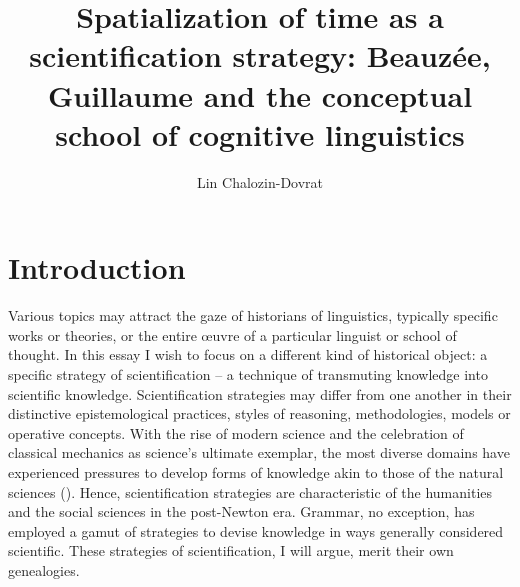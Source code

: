 \documentclass[output=paper]{langsci/langscibook}
\author{Lin Chalozin-Dovrat\affiliation{Cohn Institute for the History and Philosophy of Science and Ideas, Tel Aviv University}\orcid{}}
\title{Spatialization of time as a scientification strategy: Beauzée, Guillaume and the conceptual school of cognitive linguistics}
\begin{document}
\maketitle

\section{Introduction} 
Various topics may attract the gaze of historians of linguistics, typically specific works or theories, or the entire œuvre of a particular linguist or school of thought. In this essay I wish to focus on a different kind of historical object: a specific strategy of scientification -- a technique of transmuting knowledge into scientific knowledge. Scientification strategies may differ from one another in their distinctive epistemological practices, styles of reasoning, methodologies, models or operative concepts. With the rise of modern science and the celebration of classical mechanics as science’s ultimate exemplar, the most diverse domains have experienced pressures to develop forms of knowledge akin to those of the natural sciences (\citealt{bod_making_2014}). Hence, scientification strategies are characteristic of the humanities and the social sciences in the post-Newton era. Grammar, no exception, has employed a gamut of strategies to devise knowledge in ways generally considered scientific. These strategies of scientification, I will argue, merit their own genealogies.
\end{document}
